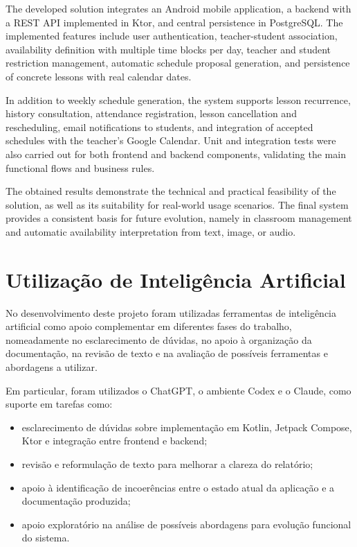 \documentclass[a4paper,openright,twoside,11pt]{report}
\begin{document}
    The developed solution integrates an Android mobile application, a backend with a REST API implemented in Ktor, and central persistence in PostgreSQL. The implemented features include user authentication, teacher-student association, availability definition with multiple time blocks per day, teacher and student restriction management, automatic schedule proposal generation, and persistence of concrete lessons with real calendar dates.

    In addition to weekly schedule generation, the system supports lesson recurrence, history consultation, attendance registration, lesson cancellation and rescheduling, email notifications to students, and integration of accepted schedules with the teacher's Google Calendar. Unit and integration tests were also carried out for both frontend and backend components, validating the main functional flows and business rules.

    The obtained results demonstrate the technical and practical feasibility of the solution, as well as its suitability for real-world usage scenarios. The final system provides a consistent basis for future evolution, namely in classroom management and automatic availability interpretation from text, image, or audio.

    \cleardoublepage
    \chapter*{Utilização de Inteligência Artificial}

    No desenvolvimento deste projeto foram utilizadas ferramentas de inteligência artificial como apoio complementar em diferentes fases do trabalho,
    nomeadamente no esclarecimento de dúvidas, no apoio à organização da documentação, na revisão de texto e na avaliação de possíveis ferramentas e abordagens a utilizar.

    Em particular, foram utilizados o ChatGPT, o ambiente Codex e o Claude, como suporte em tarefas como:
    \begin{itemize}
        \item esclarecimento de dúvidas sobre implementação em Kotlin, Jetpack Compose, Ktor e integração entre frontend e backend;
        \item revisão e reformulação de texto para melhorar a clareza do relatório;
        \item apoio à identificação de incoerências entre o estado atual da aplicação e a documentação produzida;
        \item apoio exploratório na análise de possíveis abordagens para evolução funcional do sistema.
    \end{itemize}
\end{document}

